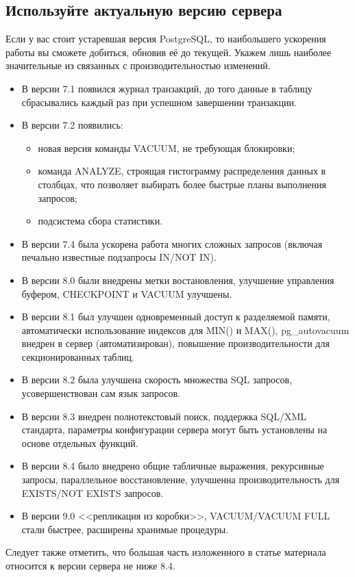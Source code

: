 \subsection{Используйте актуальную версию сервера}
Если у вас стоит устаревшая версия PostgreSQL, то наибольшего ускорения работы вы сможете 
добиться, обновив её до текущей. Укажем лишь наиболее значительные из связанных с производительностью изменений.
\begin{itemize}
\item В версии 7.1 появился журнал транзакций, до того данные в таблицу сбрасывались каждый раз при успешном завершении транзакции.
\item В версии 7.2 появились:
\begin{itemize}
\item новая версия команды VACUUM, не требующая блокировки;
\item команда ANALYZE, строящая гистограмму распределения данных в столбцах, что позволяет выбирать более 
быстрые планы выполнения запросов;
\item подсистема сбора статистики.
\end{itemize}
\item В версии 7.4 была ускорена работа многих сложных запросов (включая печально известные подзапросы IN/NOT IN).
\item В версии 8.0 были внедрены метки востановления, улучшение управления буфером, CHECKPOINT и VACUUM улучшены.
\item В версии 8.1 был улучшен одновременный доступ к разделяемой памяти, автоматически использование индексов для MIN() и MAX(),
pg\_autovacuum внедрен в сервер (автоматизирован), повышение производительности для секционированных таблиц.
\item В версии 8.2 была улучшена скорость множества SQL запросов, усовершенствован сам язык запросов. 
\item В версии 8.3 внедрен полнотекстовый поиск, поддержка SQL/XML стандарта, параметры конфигурации сервера могут быть 
установлены на основе отдельных функций.
\item В версии 8.4 было внедрено общие табличные выражения, рекурсивные запросы, параллельное восстановление, улучшенна 
производительность для EXISTS/NOT EXISTS запросов.
\item В версии 9.0 <<репликация из коробки>>, VACUUM/VACUUM FULL стали быстрее, расширены хранимые процедуры.
\end{itemize}
Следует также отметить, что большая часть изложенного в статье материала относится к версии сервера не ниже 8.4.

